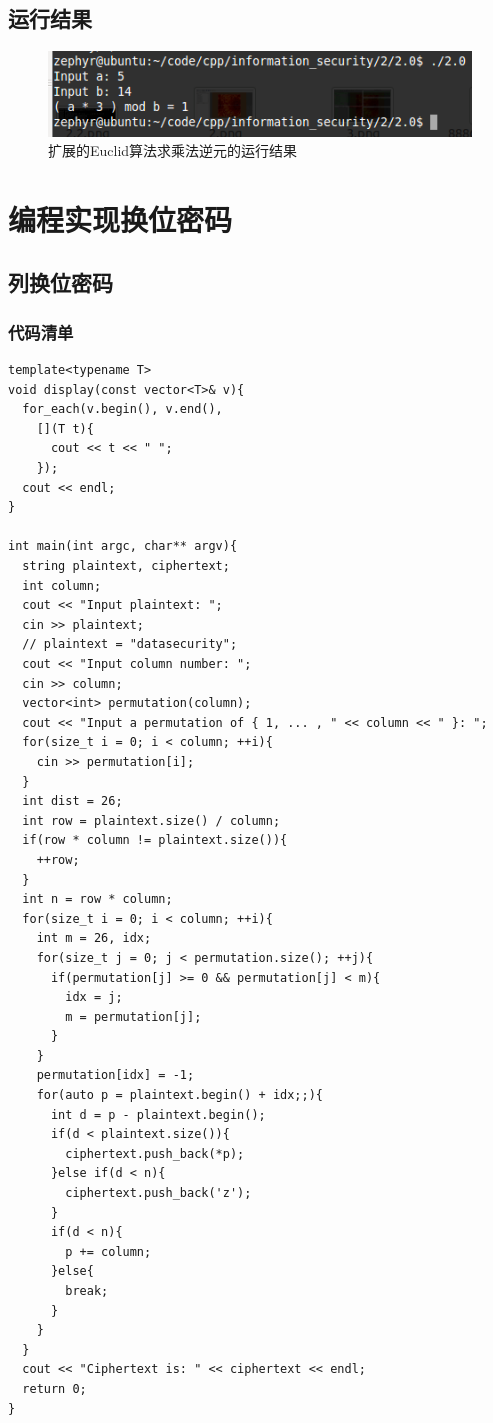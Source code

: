 \documentclass[11pt]{article}
\begin{document}
\subsection{运行结果}
\begin{center}
\begin{figure}[htbp]
\includegraphics[width=\textwidth]{2.0.png}
\caption{扩展的Euclid算法求乘法逆元的运行结果}
\label{fig: rlt1}
\end{figure}
\end{center}

\section{编程实现换位密码}

\subsection{列换位密码}
\subsubsection{代码清单}
\begin{center}
\begin{lstlisting}[caption = {列换位密码的C++实现}, label = {lst: code2}]
template<typename T>
void display(const vector<T>& v){
  for_each(v.begin(), v.end(),
    [](T t){
      cout << t << " ";
    });
  cout << endl;
}

int main(int argc, char** argv){
  string plaintext, ciphertext;
  int column;
  cout << "Input plaintext: ";
  cin >> plaintext;
  // plaintext = "datasecurity";
  cout << "Input column number: ";
  cin >> column;
  vector<int> permutation(column);
  cout << "Input a permutation of { 1, ... , " << column << " }: ";
  for(size_t i = 0; i < column; ++i){
    cin >> permutation[i];
  }
  int dist = 26;
  int row = plaintext.size() / column;
  if(row * column != plaintext.size()){
    ++row;
  }
  int n = row * column;
  for(size_t i = 0; i < column; ++i){
    int m = 26, idx;
    for(size_t j = 0; j < permutation.size(); ++j){
      if(permutation[j] >= 0 && permutation[j] < m){
        idx = j;
        m = permutation[j];
      }
    }
    permutation[idx] = -1;
    for(auto p = plaintext.begin() + idx;;){
      int d = p - plaintext.begin();
      if(d < plaintext.size()){
        ciphertext.push_back(*p);
      }else if(d < n){
        ciphertext.push_back('z');
      }
      if(d < n){
        p += column;
      }else{
        break;
      }
    }
  }
  cout << "Ciphertext is: " << ciphertext << endl;
  return 0;
}
\end{lstlisting}
\end{center}
\end{document}
